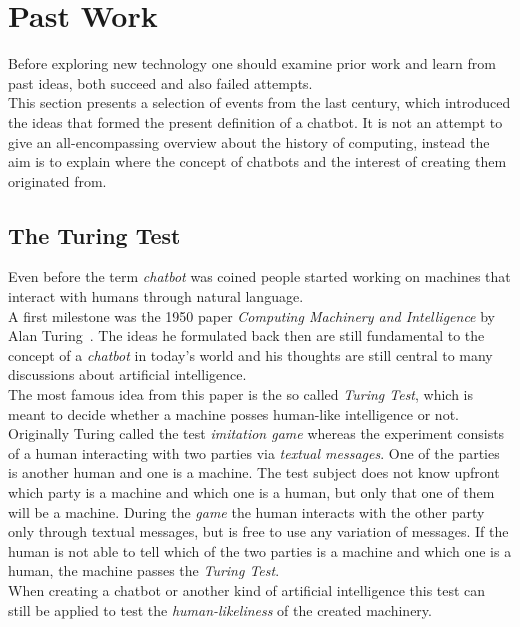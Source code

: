 \section{Past Work}


Before exploring new technology one should examine prior work and learn from past ideas, both succeed and also failed attempts.
\\
This section presents a selection of events from the last century, which introduced the ideas that formed the present definition of a chatbot.
It is not an attempt to give an all-encompassing overview about the history of computing,
instead the aim is to explain where the concept of chatbots and the interest of creating them originated from.


\subsection{The Turing Test}

Even before the term \emph{chatbot} was coined people started working on machines that interact with humans through natural language.
\\
A first milestone was the 1950 paper \emph{Computing Machinery and Intelligence} by Alan Turing~\cite{turing}.
The ideas he formulated back then are still fundamental to the concept of a \emph{chatbot} in today's world
and his thoughts are still central to many discussions about artificial intelligence.
\\
The most famous idea from this paper is the so called \emph{Turing Test},
which is meant to decide whether a machine posses human-like intelligence or not.
\\
Originally Turing called the test \emph{imitation game} whereas the experiment consists of a human interacting with two parties via \emph{textual messages}.
One of the parties is another human and one is a machine.
The test subject does not know upfront which party is a machine and which one is a human, but only that one of them will be a machine.
During the \emph{game} the human interacts with the other party
only through textual messages,
but is free to use any variation of messages.
If the human is not able to tell which of the two parties is a machine and which one is a human, the machine passes the \emph{Turing Test}.
\\
When creating a chatbot or another kind of artificial intelligence this test can still be applied to test the \emph{human-likeliness} of the created machinery.
\\


